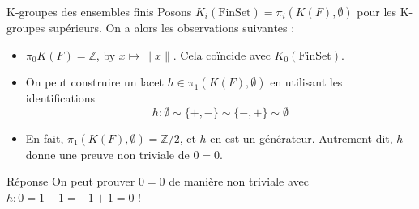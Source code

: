 \documentclass[12pt]{beamer}
\begin{document}
\begin{frame}{K-groupes des ensembles finis}
  Posons $K_i(\mathrm{FinSet})=\pi_i(K(F),\emptyset)$ pour les K-groupes supérieurs. On a alors les observations suivantes :
  \pause
  \begin{itemize}
    \item $\pi_0 K(F) = \mathbb{Z}$, by $ x \mapsto \|x\|$. Cela coïncide avec $K_0(\mathrm{FinSet})$. 
      \pause
    \item On peut construire un lacet $h\in \pi_1 (K(F),\emptyset)$ en utilisant les identifications 
      \[
        h: \emptyset \sim \{+,-\} \sim \{-,+\} \sim \emptyset
      \]
      \pause
    \item En fait, $\pi_1 (K(F),\emptyset)=\mathbb{Z}/2$, et $h$ en est un générateur. Autrement dit, $h$ donne une preuve non triviale de $0=0$. 
  \end{itemize}
  \pause
  \begin{block}{Réponse}
    On peut prouver $0=0$ de manière non triviale avec $h: 0=1-1=-1+1=0$ !
  \end{block}
\end{frame}
  
\end{document}
